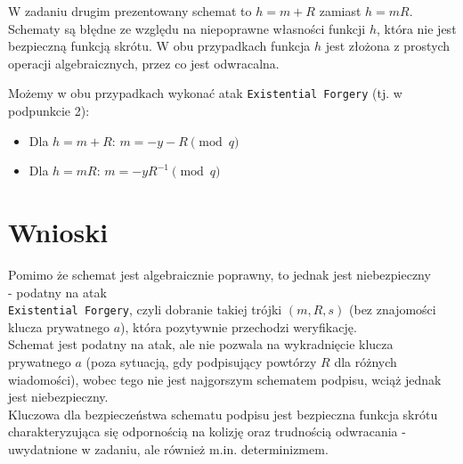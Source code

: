 \documentclass{article}
\numberwithin{equation}{subsection}
\begin{document}
\noindent
W zadaniu drugim prezentowany schemat to $h=m + R$ zamiast $h=mR$.
Schematy są błędne ze względu na niepoprawne własności funkcji $h$, która nie jest bezpieczną funkcją skrótu.
W obu przypadkach funkcja $h$ jest złożona z prostych operacji algebraicznych, przez co jest odwracalna.

\noindent
Możemy w obu przypadkach wykonać atak \texttt{Existential Forgery} (tj. w podpunkcie 2):
\begin{itemize}
    \item Dla $h=m+R$: $m = -y-R \pmod q$
    \item Dla $h=mR$: $m= -yR^{-1} \pmod q$
\end{itemize}

\section{Wnioski}

Pomimo że schemat jest algebraicznie poprawny, to jednak jest niebezpieczny \\
- podatny na atak\\ \texttt{Existential Forgery}, czyli
dobranie takiej trójki $(m,R,s)$ (bez znajomości klucza prywatnego $a$), która pozytywnie przechodzi weryfikację.\\

\noindent
Schemat jest podatny na atak, ale nie pozwala na wykradnięcie klucza prywatnego $a$ (poza sytuacją, gdy
podpisujący powtórzy $R$ dla różnych wiadomości), wobec tego nie jest najgorszym schematem podpisu, wciąż jednak jest niebezpieczny.\\

\noindent
Kluczowa dla bezpieczeństwa schematu podpisu jest bezpieczna funkcja skrótu charakteryzująca
się odpornością na kolizję oraz trudnością odwracania - uwydatnione w zadaniu,
ale również m.in. determinizmem. 
\end{document}
